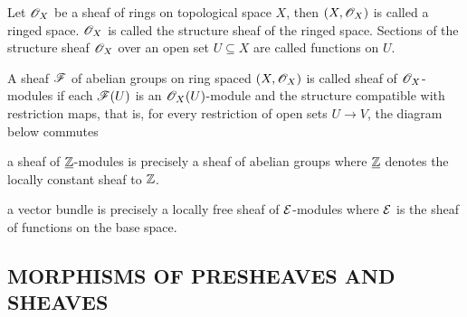 \begin{definition}
	Let $\mathscr{O}_X$ be a sheaf of rings on topological space $X$, then $(X, \mathscr{O}_X)$ is called a ringed space. $\mathscr{O}_X$ is called the structure sheaf of the ringed space. Sections of the structure sheaf $\mathscr{O}_X$ over an open set $U \subseteq X$ are called functions on $U$.
	
	A sheaf $\mathscr{F}$ of abelian groups on ring spaced $(X, \mathscr{O}_X)$ is called sheaf of $\mathscr{O}_X$-modules if each $\mathscr{F}(U)$ is an $\mathscr{O}_X(U)$-module and the structure compatible with restriction maps, that is, for every restriction of open sets $U \to V$, the diagram below commutes
	\begin{center}
	\end{center}
\end{definition}

\begin{remark}
	a sheaf of $\underline{\mathbb{Z}}$-modules is precisely a sheaf of abelian groups where $\underline{\mathbb{Z}}$ denotes the locally constant sheaf to $\mathbb{Z}$.
\end{remark}

\begin{remark}
	a vector bundle is precisely a locally free sheaf of $\mathcal{E}$-modules where $\mathcal{E}$ is the sheaf of functions on the base space.
\end{remark}

\subsection{MORPHISMS OF PRESHEAVES AND SHEAVES}

